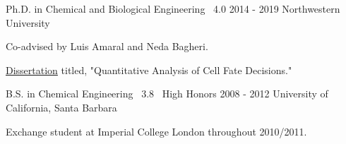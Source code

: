 

\begin{cventries}

  \cventrynew
	{Ph.D. in Chemical and Biological Engineering \bullet\ 4.0} 	
	{2014 - 2019}
	{Northwestern University}
    { \begin{cvitems} 
      	\item {Co-advised by Luis Amaral and Neda Bagheri.}
      	\item {\href{https://github.com/sebastianbernasek/dissertation}{Dissertation} titled, "Quantitative Analysis of Cell Fate Decisions."}
      \end{cvitems}}
            	   
    
  \cventrynew
	{B.S. in Chemical Engineering \bullet\ 3.8 \bullet\ High Honors} 	
	{2008 - 2012} 	
	{University of California, Santa Barbara}    
    {
      \begin{cvitems} %
      	\item {Exchange student at Imperial College London throughout 2010/2011.}      	
      \end{cvitems}
    }

\end{cventries}

